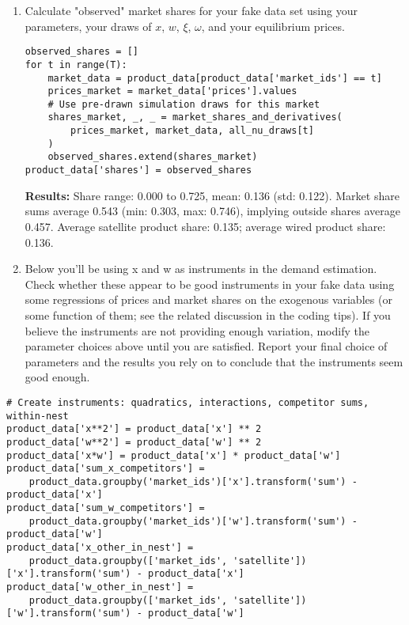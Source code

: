 \documentclass[english,11pt]{article}
\begin{document}
\begin{enumerate}
\begin{enumerate}
\item Calculate "observed" market shares for your fake data set using your parameters, your draws of $x$, $w$, $\xi$, $\omega$, and your equilibrium prices.

\begin{verbatim}
observed_shares = []
for t in range(T):
    market_data = product_data[product_data['market_ids'] == t]
    prices_market = market_data['prices'].values
    # Use pre-drawn simulation draws for this market
    shares_market, _, _ = market_shares_and_derivatives(
        prices_market, market_data, all_nu_draws[t]
    )
    observed_shares.extend(shares_market)
product_data['shares'] = observed_shares
\end{verbatim}

\textbf{Results:} Share range: 0.000 to 0.725, mean: 0.136 (std: 0.122). Market share sums average 0.543 (min: 0.303, max: 0.746), implying outside shares average 0.457. Average satellite product share: 0.135; average wired product share: 0.136.

\item

Below you'll be using x and w as instruments in the demand estimation. Check whether these appear to be good instruments in your fake data using some regressions of prices and market shares on the exogenous variables (or some function of them; see the related discussion in the coding tips). If you believe the instruments are not providing enough variation, modify the parameter choices above until you are satisfied. Report your final choice of parameters and the results you rely on to conclude that the instruments seem good enough.
\end{enumerate}

\begin{verbatim}
# Create instruments: quadratics, interactions, competitor sums, within-nest
product_data['x**2'] = product_data['x'] ** 2
product_data['w**2'] = product_data['w'] ** 2
product_data['x*w'] = product_data['x'] * product_data['w']
product_data['sum_x_competitors'] = 
    product_data.groupby('market_ids')['x'].transform('sum') - product_data['x']
product_data['sum_w_competitors'] = 
    product_data.groupby('market_ids')['w'].transform('sum') - product_data['w']
product_data['x_other_in_nest'] = 
    product_data.groupby(['market_ids', 'satellite'])['x'].transform('sum') - product_data['x']
product_data['w_other_in_nest'] = 
    product_data.groupby(['market_ids', 'satellite'])['w'].transform('sum') - product_data['w']


\end{verbatim}
\end{enumerate}
\end{document}
